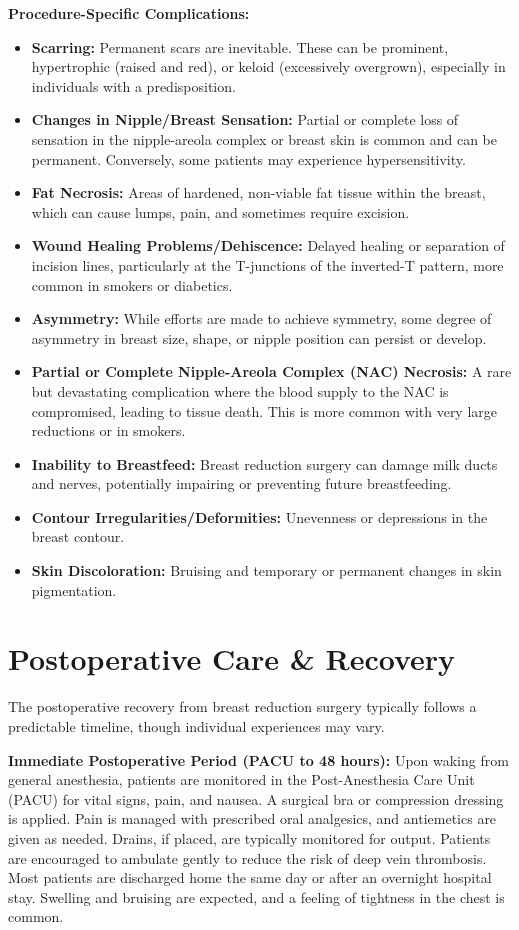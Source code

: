 \textbf{Procedure-Specific Complications:}
\begin{itemize}
  \item \textbf{Scarring:} Permanent scars are inevitable. These can be prominent, hypertrophic (raised and red), or keloid (excessively overgrown), especially in individuals with a predisposition.
  \item \textbf{Changes in Nipple/Breast Sensation:} Partial or complete loss of sensation in the nipple-areola complex or breast skin is common and can be permanent. Conversely, some patients may experience hypersensitivity.
  \item \textbf{Fat Necrosis:} Areas of hardened, non-viable fat tissue within the breast, which can cause lumps, pain, and sometimes require excision.
  \item \textbf{Wound Healing Problems/Dehiscence:} Delayed healing or separation of incision lines, particularly at the T-junctions of the inverted-T pattern, more common in smokers or diabetics.
  \item \textbf{Asymmetry:} While efforts are made to achieve symmetry, some degree of asymmetry in breast size, shape, or nipple position can persist or develop.
  \item \textbf{Partial or Complete Nipple-Areola Complex (NAC) Necrosis:} A rare but devastating complication where the blood supply to the NAC is compromised, leading to tissue death. This is more common with very large reductions or in smokers.
  \item \textbf{Inability to Breastfeed:} Breast reduction surgery can damage milk ducts and nerves, potentially impairing or preventing future breastfeeding.
  \item \textbf{Contour Irregularities/Deformities:} Unevenness or depressions in the breast contour.
  \item \textbf{Skin Discoloration:} Bruising and temporary or permanent changes in skin pigmentation.
\end{itemize}

\section*{Postoperative Care \& Recovery}
The postoperative recovery from breast reduction surgery typically follows a predictable timeline, though individual experiences may vary.

\textbf{Immediate Postoperative Period (PACU to 48 hours):}
Upon waking from general anesthesia, patients are monitored in the Post-Anesthesia Care Unit (PACU) for vital signs, pain, and nausea. A surgical bra or compression dressing is applied. Pain is managed with prescribed oral analgesics, and antiemetics are given as needed. Drains, if placed, are typically monitored for output. Patients are encouraged to ambulate gently to reduce the risk of deep vein thrombosis. Most patients are discharged home the same day or after an overnight hospital stay. Swelling and bruising are expected, and a feeling of tightness in the chest is common.

